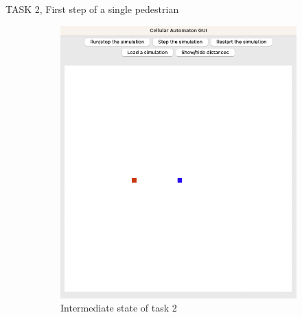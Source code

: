 \documentclass[10pt,a4paper]{article}
\begin{document}
\begin{task}{TASK 2, First step of a single pedestrian}
\begin{figure}[h]
  \centering
  \begin{subfigure}[b]{0.4\textwidth}
    \includegraphics[width=\textwidth]{pictures/Task2_Intermediate state.png}
    \caption{Intermediate state of task 2}
    \label{fig:Intermediate state of task 2}
  \end{subfigure}
  \hfill
  \begin{subfigure}[b]{0.4\textwidth}

\end{subfigure}
\end{figure}
\end{task}
\end{document}
